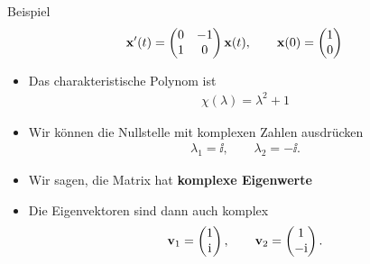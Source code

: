 \begin{frame}{Beispiel}
  \begin{gather*}
    \mathbf{x}'(t) =
    \begin{pmatrix}
      0 & -1 \\ 1 & 0
    \end{pmatrix} \mathbf{x}(t),\qquad \mathbf{x}(0) =
    \begin{pmatrix}
      1 \\ 0
    \end{pmatrix}
  \end{gather*}
  \begin{itemize}
  \item<+-> Das charakteristische Polynom ist
    \begin{gather*}
      \chi(\lambda) = \lambda^2+1
    \end{gather*}
  \item<+-> Wir können die Nullstelle mit komplexen Zahlen ausdrücken
    \begin{gather*}
      \lambda_1 = \ii,\qquad \lambda_2 = -\ii.
    \end{gather*}
  \item<+-> Wir sagen, die Matrix hat \textbf{komplexe Eigenwerte}
  \item<+-> Die Eigenvektoren sind dann auch komplex
    \begin{gather*}
      \mathbf{v}_1 =
      \begin{pmatrix}
        1\\\mathrm i
      \end{pmatrix},\qquad
      \mathbf{v}_2 =
      \begin{pmatrix}
        1\\-\mathrm i
      \end{pmatrix}.     
    \end{gather*}
  \end{itemize}
\end{frame}


